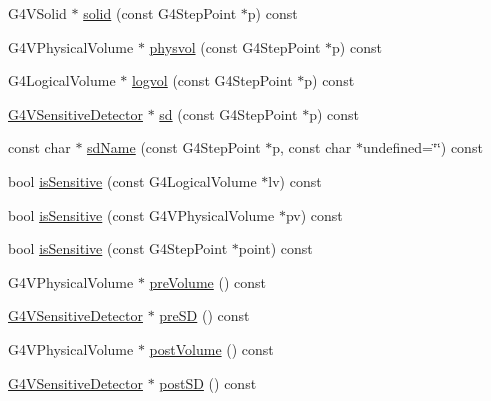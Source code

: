 \begin{DoxyCompactItemize}
G4\+V\+Solid $\ast$ \hyperlink{class_d_d4hep_1_1_simulation_1_1_geant4_step_handler_aa132f6298c07600c95aa3a6f92f26985}{solid} (const G4\+Step\+Point $\ast$p) const
\item 
G4\+V\+Physical\+Volume $\ast$ \hyperlink{class_d_d4hep_1_1_simulation_1_1_geant4_step_handler_a426ef22f777e563d8aaae3630372f913}{physvol} (const G4\+Step\+Point $\ast$p) const
\item 
G4\+Logical\+Volume $\ast$ \hyperlink{class_d_d4hep_1_1_simulation_1_1_geant4_step_handler_a53a2b41474e29e847e68fec64060bf60}{logvol} (const G4\+Step\+Point $\ast$p) const
\item 
\hyperlink{class_g4_v_sensitive_detector}{G4\+V\+Sensitive\+Detector} $\ast$ \hyperlink{class_d_d4hep_1_1_simulation_1_1_geant4_step_handler_a1d1ca52479f381ba0aea15ce64c6d09e}{sd} (const G4\+Step\+Point $\ast$p) const
\item 
const char $\ast$ \hyperlink{class_d_d4hep_1_1_simulation_1_1_geant4_step_handler_a806c70983f2c58596a75099f8ac36395}{sd\+Name} (const G4\+Step\+Point $\ast$p, const char $\ast$undefined=\char`\"{}\char`\"{}) const
\item 
bool \hyperlink{class_d_d4hep_1_1_simulation_1_1_geant4_step_handler_aef01d884b1c2ca9e728e74e1b43a12fe}{is\+Sensitive} (const G4\+Logical\+Volume $\ast$lv) const
\item 
bool \hyperlink{class_d_d4hep_1_1_simulation_1_1_geant4_step_handler_af411bcef115f2924a2966a19181c49c8}{is\+Sensitive} (const G4\+V\+Physical\+Volume $\ast$pv) const
\item 
bool \hyperlink{class_d_d4hep_1_1_simulation_1_1_geant4_step_handler_a09217021b75c4be5ce4d33c4104d5b09}{is\+Sensitive} (const G4\+Step\+Point $\ast$point) const
\item 
G4\+V\+Physical\+Volume $\ast$ \hyperlink{class_d_d4hep_1_1_simulation_1_1_geant4_step_handler_ac40ec64fd69ed915b95fb79cdc20c741}{pre\+Volume} () const
\item 
\hyperlink{class_g4_v_sensitive_detector}{G4\+V\+Sensitive\+Detector} $\ast$ \hyperlink{class_d_d4hep_1_1_simulation_1_1_geant4_step_handler_a7b3384fa3ce4d4465a79aa286371b4bb}{pre\+SD} () const
\item 
G4\+V\+Physical\+Volume $\ast$ \hyperlink{class_d_d4hep_1_1_simulation_1_1_geant4_step_handler_afee73068f429b8f9956acad5580493a9}{post\+Volume} () const
\item 
\hyperlink{class_g4_v_sensitive_detector}{G4\+V\+Sensitive\+Detector} $\ast$ \hyperlink{class_d_d4hep_1_1_simulation_1_1_geant4_step_handler_adb9d9942e898b61710985c58eda88972}{post\+SD} () const

\end{DoxyCompactItemize}
